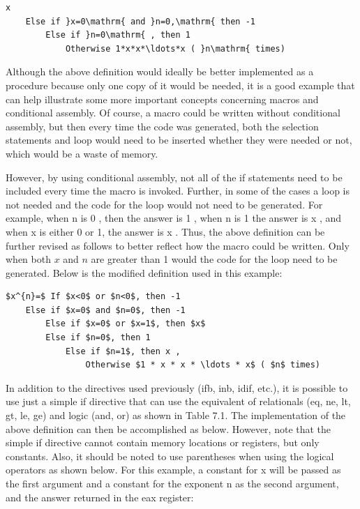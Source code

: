 \documentclass[10pt]{book}
\begin{document}
\begin{verbatim}
x
    Else if }x=0\mathrm{ and }n=0,\mathrm{ then -1
        Else if }n=0\mathrm{ , then 1
            Otherwise 1*x*x*\ldots*x ( }n\mathrm{ times)
\end{verbatim}

Although the above definition would ideally be better implemented as a procedure because only one copy of it would be needed, it is a good example that can help illustrate some more important concepts concerning macros and conditional assembly. Of course, a macro could be written without conditional assembly, but then every time the code was generated, both the selection statements and loop would need to be inserted whether they were needed or not, which would be a waste of memory.

However, by using conditional assembly, not all of the if statements need to be included every time the macro is invoked. Further, in some of the cases a loop is not needed and the code for the loop would not need to be generated. For example, when n is 0 , then the answer is 1 , when n is 1 the answer is x , and when x is either 0 or 1, the answer is x . Thus, the above definition can be further revised as follows to better reflect how the macro could be written. Only when both $x$ and $n$ are greater than 1 would the code for the loop need to be generated. Below is the modified definition used in this example:

\begin{verbatim}
$x^{n}=$ If $x<0$ or $n<0$, then -1
    Else if $x=0$ and $n=0$, then -1
        Else if $x=0$ or $x=1$, then $x$
        Else if $n=0$, then 1
            Else if $n=1$, then x ,
                Otherwise $1 * x * x * \ldots * x$ ( $n$ times)
\end{verbatim}

In addition to the directives used previously (ifb, inb, idif, etc.), it is possible to use just a simple if directive that can use the equivalent of relationals (eq, ne, lt, gt, le, ge) and logic (and, or) as shown in Table 7.1. The implementation of the above definition can then be accomplished as below. However, note that the simple if directive cannot contain memory locations or registers, but only constants. Also, it should be noted to use parentheses when using the logical operators as shown below. For this example, a constant for x will be passed as the first argument and a constant for the exponent n as the second argument, and the answer returned in the eax register:
\end{document}
